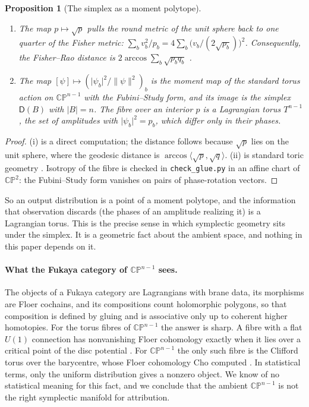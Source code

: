 \documentclass[11pt]{article}
\newtheorem{proposition}[theorem]{Proposition}
\theoremstyle{definition}
\theoremstyle{remark}
\newcommand{\D}{\mathsf{D}}
\begin{document}
\begin{proposition}[The simplex as a moment polytope]\label{prop:geometry}
\leavevmode
\begin{enumerate}[label=(\roman*)]
\item The map $p\mapsto\sqrt p$ pulls the round metric of the unit sphere back to one quarter of the
  Fisher metric: $\sum_bv_b^2/p_b=4\sum_b\big(v_b/(2\sqrt{p_b})\big)^2$. Consequently, the Fisher--Rao
  distance is $2\arccos\sum_b\sqrt{p_bq_b}$ \cite{Wootters1981,AmariNagaoka2000}.
\item The map $[\psi]\mapsto(\lvert\psi_b\rvert^2/\lVert\psi\rVert^2)_b$ is the moment map of the
  standard torus action on $\mathbb{CP}^{n-1}$ with the Fubini--Study form, and its image is the
  simplex $\D(B)$ with $\lvert B\rvert=n$. The fibre over an interior $p$ is a Lagrangian torus
  $T^{n-1}$, the set of amplitudes with $\lvert\psi_b\rvert^2=p_b$, which differ only in their phases.
\end{enumerate}
\end{proposition}
\begin{proof}
(i) is a direct computation; the distance follows because $\sqrt p$ lies on the unit sphere, where
the geodesic distance is $\arccos\langle\sqrt p,\sqrt q\rangle$. (ii) is standard toric geometry
\cite{Delzant1988}. Isotropy of the fibre is checked in \texttt{check\_glue.py} in an affine chart of
$\mathbb{CP}^2$: the Fubini--Study form vanishes on pairs of phase-rotation vectors.
\end{proof}

So an output distribution is a point of a moment polytope, and the information that observation
discards (the phases of an amplitude realizing it) is a Lagrangian torus. This is the precise
sense in which symplectic geometry sits under the simplex. It is a geometric fact about the ambient
space, and nothing in this paper depends on it.

\paragraph{What the Fukaya category of $\mathbb{CP}^{n-1}$ sees.} The objects of a Fukaya category are
Lagrangians with brane data, its morphisms are Floer cochains, and its compositions count holomorphic
polygons, so that composition is defined by gluing and is associative only up to coherent higher
homotopies. For the torus fibres of $\mathbb{CP}^{n-1}$ the answer is sharp. A fibre with a flat
$U(1)$ connection has nonvanishing Floer cohomology exactly when it lies over a critical point of
the disc potential \cite{ChoOh2006,FOOO2010}. For $\mathbb{CP}^{n-1}$ the only such fibre is the
Clifford torus over the barycentre, whose Floer cohomology Cho computed \cite{Cho2004}. In statistical terms, only
the uniform distribution gives a nonzero object. We know of no statistical meaning for this fact, and
we conclude that the ambient $\mathbb{CP}^{n-1}$ is not the right symplectic manifold for attribution.
\end{document}
